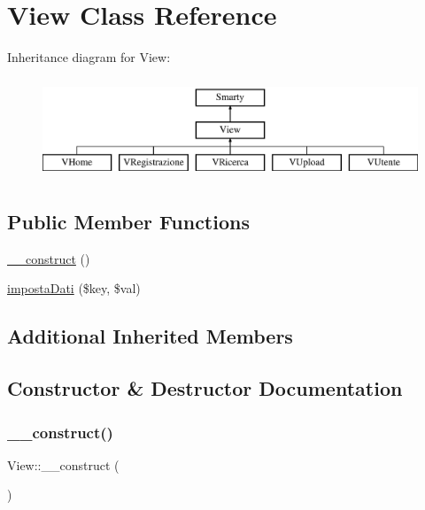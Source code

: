 \hypertarget{class_view}{}\section{View Class Reference}
\label{class_view}
Inheritance diagram for View\+:\begin{figure}[H]
\begin{center}
\leavevmode
\includegraphics[height=3.000000cm]{class_view}
\end{center}
\end{figure}
\subsection*{Public Member Functions}
\begin{DoxyCompactItemize}
\item 
\mbox{\hyperlink{class_view_aa9573525dcc8de4c463a1e7587ab7c5a}{\+\_\+\+\_\+construct}} ()
\item 
\mbox{\hyperlink{class_view_af9fd6b248a5a2baefff04116e90e50ac}{imposta\+Dati}} (\$key, \$val)
\end{DoxyCompactItemize}
\subsection*{Additional Inherited Members}


\subsection{Constructor \& Destructor Documentation}
\mbox{\label{class_view_aa9573525dcc8de4c463a1e7587ab7c5a}} 
\subsubsection{\texorpdfstring{\+\_\+\+\_\+construct()}{\_\_construct()}}
{\footnotesize\ttfamily View\+::\+\_\+\+\_\+construct (\begin{DoxyParamCaption}{ }\end{DoxyParamCaption})}

